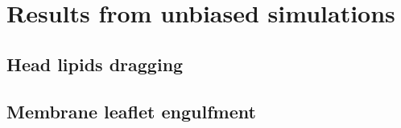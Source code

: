 \chapter{Results from unbiased simulations}

\section{Head lipids dragging}

\section{Membrane leaflet engulfment}
